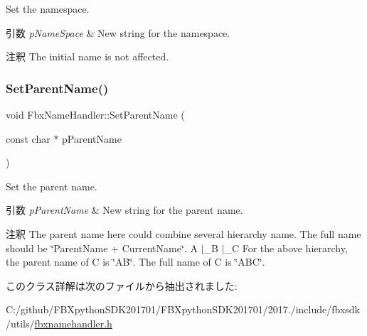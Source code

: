 Set the namespace. 
\begin{DoxyParams}{引数}
{\em p\+Name\+Space} & New string for the namespace. \\
\hline
\end{DoxyParams}
\begin{DoxyRemark}{注釈}
The initial name is not affected. 
\end{DoxyRemark}
\mbox{\label{class_fbx_name_handler_a647b1b11442049cebf1e958fcc523608}} 
\subsubsection{\texorpdfstring{Set\+Parent\+Name()}{SetParentName()}}
{\footnotesize\ttfamily void Fbx\+Name\+Handler\+::\+Set\+Parent\+Name (\begin{DoxyParamCaption}\item[{const char $\ast$}]{p\+Parent\+Name }\end{DoxyParamCaption})}

Set the parent name. 
\begin{DoxyParams}{引数}
{\em p\+Parent\+Name} & New string for the parent name. \\
\hline
\end{DoxyParams}
\begin{DoxyRemark}{注釈}
The parent name here could combine several hierarchy name. The full name should be \char`\"{}\+Parent\+Name + Current\+Name\char`\"{}. A $\vert$\+\_\+B $\vert$\+\_\+C For the above hierarchy, the parent name of C is \char`\"{}\+A\+B\char`\"{}. The full name of C is \char`\"{}\+A\+B\+C\char`\"{}. 
\end{DoxyRemark}


このクラス詳解は次のファイルから抽出されました\+:\begin{DoxyCompactItemize}
\item 
C\+:/github/\+F\+B\+Xpython\+S\+D\+K201701/\+F\+B\+Xpython\+S\+D\+K201701/2017./include/fbxsdk/utils/\hyperlink{fbxnamehandler_8h}{fbxnamehandler.\+h}\end{DoxyCompactItemize}
